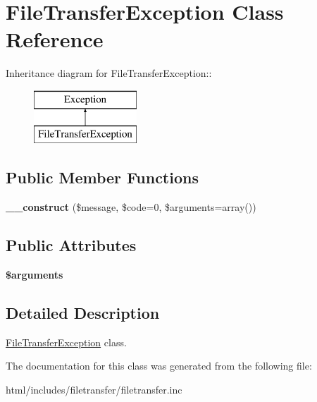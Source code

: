 \hypertarget{classFileTransferException}{
\section{FileTransferException Class Reference}
\label{classFileTransferException}
}
Inheritance diagram for FileTransferException::\begin{figure}[H]
\begin{center}
\leavevmode
\includegraphics[height=2cm]{classFileTransferException}
\end{center}
\end{figure}
\subsection*{Public Member Functions}
\begin{DoxyCompactItemize}
\item 
\hypertarget{classFileTransferException_a88a4fb6187129b45c751436a61774362}{
{\bfseries \_\-\_\-construct} (\$message, \$code=0, \$arguments=array())}
\label{classFileTransferException_a88a4fb6187129b45c751436a61774362}

\end{DoxyCompactItemize}
\subsection*{Public Attributes}
\begin{DoxyCompactItemize}
\item 
\hypertarget{classFileTransferException_aa540db4a51461e918abe9356fcc9fbb2}{
{\bfseries \$arguments}}
\label{classFileTransferException_aa540db4a51461e918abe9356fcc9fbb2}

\end{DoxyCompactItemize}


\subsection{Detailed Description}
\hyperlink{classFileTransferException}{FileTransferException} class. 

The documentation for this class was generated from the following file:\begin{DoxyCompactItemize}
\item 
html/includes/filetransfer/filetransfer.inc\end{DoxyCompactItemize}
